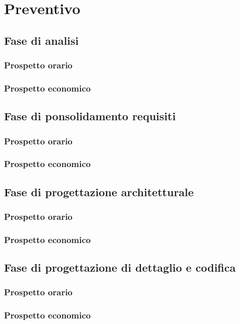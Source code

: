 \section{Preventivo}

\subsection{Fase di analisi}
\subsubsection{Prospetto orario}
\subsubsection{Prospetto economico}

\subsection{Fase di ponsolidamento requisiti}
\subsubsection{Prospetto orario}
\subsubsection{Prospetto economico}

\subsection{Fase di progettazione architetturale}
\subsubsection{Prospetto orario}
\subsubsection{Prospetto economico}

\subsection{Fase di progettazione di dettaglio e codifica}
\subsubsection{Prospetto orario}
\subsubsection{Prospetto economico}

